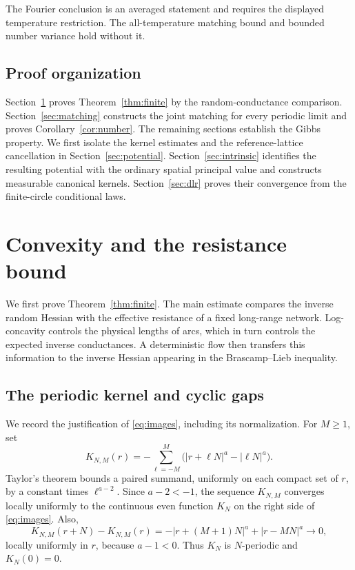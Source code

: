 \documentclass[11pt]{article}
\theoremstyle{remark}\newtheorem{remark}[theorem]{Remark}
\begin{document}
The Fourier conclusion is an averaged statement and requires the
displayed temperature restriction. The all-temperature matching
bound and bounded number variance hold without it.

\subsection{Proof organization}

Section~\ref{sec:finite} proves Theorem~\ref{thm:finite} by the
random-conductance comparison. Section~\ref{sec:matching} constructs
the joint matching for every periodic limit and proves
Corollary~\ref{cor:number}. The remaining sections establish the
Gibbs property. We first isolate the kernel estimates and the
reference-lattice cancellation in Section~\ref{sec:potential}.
Section~\ref{sec:intrinsic} identifies the resulting potential with
the ordinary spatial principal value and constructs measurable
canonical kernels. Section~\ref{sec:dlr} proves their convergence
from the finite-circle conditional laws.

\section{Convexity and the resistance bound}
\label{sec:finite}

We first prove Theorem~\ref{thm:finite}.  The main estimate compares
the inverse random Hessian with the effective resistance of a fixed
long-range network.  Log-concavity controls the physical lengths of
arcs, which in turn controls the expected inverse conductances.  A
deterministic flow then transfers this information to the inverse
Hessian appearing in the Brascamp--Lieb inequality.

\subsection{The periodic kernel and cyclic gaps}

We record the justification of \eqref{eq:images}, including its
normalization.  For $M\ge1$, set
\[
 K_{N,M}(r)=-\sum_{\ell=-M}^{M}
                  \bigl(|r+\ell N|^a-|\ell N|^a\bigr).
\]
Taylor's theorem bounds a paired summand, uniformly on each compact
set of $r$, by a constant times $\ell^{a-2}$.  Since $a-2<-1$,
the sequence $K_{N,M}$ converges locally uniformly to the continuous
even function $K_N$ on the right side of \eqref{eq:images}.  Also,
\[
 K_{N,M}(r+N)-K_{N,M}(r)
       =-|r+(M+1)N|^a+|r-MN|^a\longrightarrow0,
\]
locally uniformly in $r$, because $a-1<0$.  Thus $K_N$ is
$N$-periodic and $K_N(0)=0$.
\end{document}
